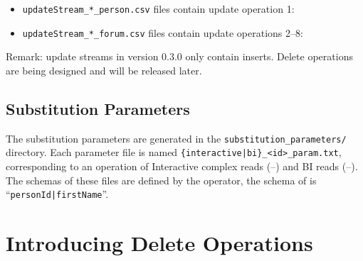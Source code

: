 \begin{itemize}
    \item \texttt{updateStream\_*\_person.csv} files contain update operation 1: 
    \item \texttt{updateStream\_*\_forum.csv} files contain update operations 2--8: %
\end{itemize}

Remark: update streams in version 0.3.0 only contain inserts. Delete operations are being designed and will be released later.

\subsection{Substitution Parameters}

The substitution parameters are generated in the \texttt{substitution\_parameters/} directory.
Each parameter file is named \texttt{\{interactive|bi\}\_<id>\_param.txt}, corresponding to an operation of
Interactive complex reads (--) and
BI reads (--).
The schemas of these files are defined by the operator, \eg the schema of  is ``\texttt{personId|firstName}''.


\section{Introducing Delete Operations}


